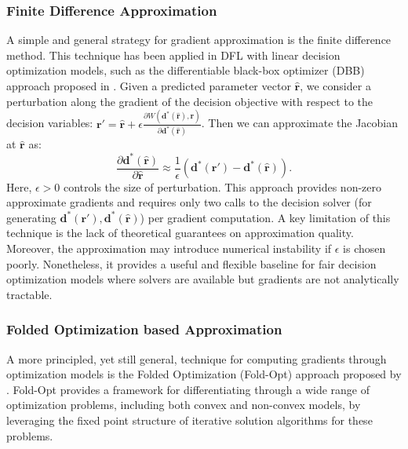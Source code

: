\documentclass[ijoc,sglanonrev]{informs4}
\begin{document}
\subsubsection{Finite Difference Approximation} \label{sec:finite-diff}
A simple and general strategy for gradient approximation is the finite difference method. 
This technique has been applied in DFL with linear decision optimization models, such as the differentiable black-box optimizer (DBB) approach proposed in \cite{poganvcic2020differentiation}. Given a predicted parameter vector $\hat{\mathbf{r}}$, we consider a perturbation along the gradient of the decision objective with respect to the decision variables: $\mathbf{r}' = \hat{\mathbf{r}} + \epsilon \frac{\partial{W(\mathbf{d^*}(\mathbf{\hat{r}}),\mathbf{r})}}{\partial{\mathbf{d^*}(\mathbf{\hat{r}})}}$. Then we can approximate the Jacobian at $\hat{\mathbf{r}}$ as:
\begin{equation} \label{eq:grad-approx} 
\frac{\partial \mathbf{d}^*(\hat{\mathbf{r}})}{\partial \hat{\mathbf{r}}} \approx \frac{1}{\epsilon}(\mathbf{d}^*(\mathbf{r}') - \mathbf{d}^*(\hat{\mathbf{r}})).
\end{equation}
Here, $\epsilon > 0$ controls the size of perturbation. This approach provides non-zero approximate gradients and requires only two calls to the decision solver (for generating $\mathbf{d}^*(\mathbf{r}'), \mathbf{d}^*(\hat{\mathbf{r}})$) per gradient computation. A key limitation of this technique is the lack of theoretical guarantees on approximation quality. Moreover, the approximation may introduce numerical instability if $\epsilon$ is chosen poorly. 
Nonetheless, it provides a useful and flexible baseline for fair decision optimization models where solvers are available but gradients are not analytically tractable.


\subsubsection{Folded Optimization based Approximation} \label{sec:foldopt}
A more principled, yet still general, technique for computing gradients through optimization models is the Folded Optimization (Fold-Opt) approach proposed by \citet{kotaryfoldopt2023}. Fold-Opt provides a framework for differentiating through a wide range of optimization problems, including both convex and non-convex models, by leveraging the fixed point structure of iterative solution algorithms for these problems. 
\end{document}
